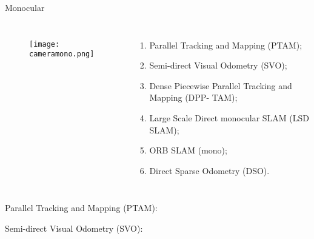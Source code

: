 \begin{frame}[t]{Monocular}
    \transboxout[duration=0.5]
    \begin{columns}
            \begin{figure}
                \texttt{[image: cameramono.png]}
                \caption{\cite{Baslerca30}}
            \end{figure}
            \begin{enumerate}
                \item Parallel Tracking and Mapping (PTAM);
                \item Semi-direct Visual Odometry (SVO);
                \item Dense Piecewise Parallel Tracking and Mapping (DPP-
                        TAM);
                \item Large Scale Direct monocular SLAM (LSD SLAM);
                \item ORB SLAM (mono);
                \item Direct Sparse Odometry (DSO).
            \end{enumerate}
    \end{columns}
\end{frame}
\begin{frame}[c]{Parallel Tracking and Mapping (PTAM):}
    \centering


\end{frame}
\begin{frame}[c]{Semi-direct Visual Odometry (SVO):}
    \centering


\end{frame}
